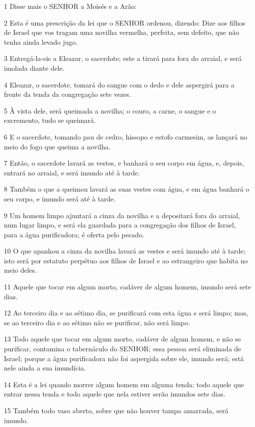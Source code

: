 \par 1 Disse mais o SENHOR a Moisés e a Arão:
\par 2 Esta é uma prescrição da lei que o SENHOR ordenou, dizendo: Dize aos filhos de Israel que vos tragam uma novilha vermelha, perfeita, sem defeito, que não tenha ainda levado jugo.
\par 3 Entregá-la-eis a Eleazar, o sacerdote; este a tirará para fora do arraial, e será imolada diante dele.
\par 4 Eleazar, o sacerdote, tomará do sangue com o dedo e dele aspergirá para a frente da tenda da congregação sete vezes.
\par 5 À vista dele, será queimada a novilha; o couro, a carne, o sangue e o excremento, tudo se queimará.
\par 6 E o sacerdote, tomando pau de cedro, hissopo e estofo carmesim, os lançará no meio do fogo que queima a novilha.
\par 7 Então, o sacerdote lavará as vestes, e banhará o seu corpo em água, e, depois, entrará no arraial, e será imundo até à tarde.
\par 8 Também o que a queimou lavará as suas vestes com água, e em água banhará o seu corpo, e imundo será até à tarde.
\par 9 Um homem limpo ajuntará a cinza da novilha e a depositará fora do arraial, num lugar limpo, e será ela guardada para a congregação dos filhos de Israel, para a água purificadora; é oferta pelo pecado.
\par 10 O que apanhou a cinza da novilha lavará as vestes e será imundo até à tarde; isto será por estatuto perpétuo aos filhos de Israel e ao estrangeiro que habita no meio deles.
\par 11 Aquele que tocar em algum morto, cadáver de algum homem, imundo será sete dias.
\par 12 Ao terceiro dia e ao sétimo dia, se purificará com esta água e será limpo; mas, se ao terceiro dia e ao sétimo não se purificar, não será limpo.
\par 13 Todo aquele que tocar em algum morto, cadáver de algum homem, e não se purificar, contamina o tabernáculo do SENHOR; essa pessoa será eliminada de Israel; porque a água purificadora não foi aspergida sobre ele, imundo será; está nele ainda a sua imundícia.
\par 14 Esta é a lei quando morrer algum homem em alguma tenda: todo aquele que entrar nessa tenda e todo aquele que nela estiver serão imundos sete dias.
\par 15 Também todo vaso aberto, sobre que não houver tampa amarrada, será imundo.
